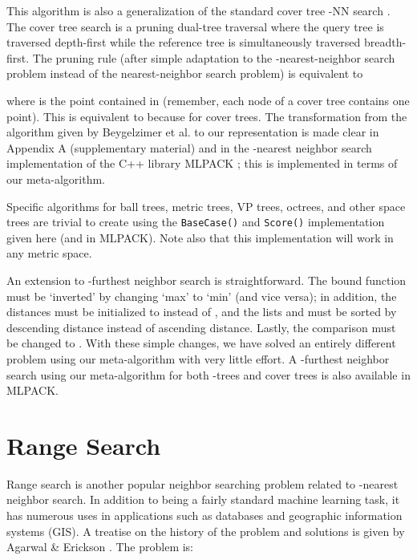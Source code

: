 \documentclass{article}
\begin{document}
This algorithm is also a generalization of the standard cover tree -NN search
\cite{langford2006}.  The cover tree search is a pruning dual-tree
traversal where the query tree is traversed depth-first while the reference
tree is simultaneously traversed breadth-first.  The pruning rule (after
simple adaptation to the -nearest-neighbor search problem instead of the
nearest-neighbor search problem) is equivalent to

\vspace*{-0.8em}

\vspace*{-1.8em}

where  is the point contained in  (remember, each node of a
cover tree contains one point).  This is equivalent to 
because  for cover trees.  The transformation from the
algorithm given by Beygelzimer et al.   to our
representation is made clear in Appendix A (supplementary material) and in the
-nearest neighbor search implementation of the C++ library MLPACK
\cite{curtin2011}; this is implemented in terms of our meta-algorithm.

\vspace*{-0.1em}
Specific algorithms for ball trees, metric trees, VP trees, octrees, and other
space trees are trivial to create using the \texttt{BaseCase()} and
\texttt{Score()} implementation given here (and in MLPACK).  Note also that this
implementation will work in any metric space.

\vspace*{-0.1em}
An extension to -furthest neighbor search is straightforward.  The bound
function must be `inverted' by changing `max' to `min' (and vice versa); in
addition, the distances  must be initialized to  instead of
, and the lists  and  must be sorted by descending distance
instead of ascending distance.  Lastly, the comparison  must be
changed to .  With these simple changes, we have solved an
entirely different problem using our meta-algorithm with very little effort.  A
-furthest neighbor search using our meta-algorithm for both -trees and
cover trees is also available in MLPACK.


\vspace*{-0.5em}
\section{Range Search}
\label{sec:range}

\vspace*{-0.1em}
Range search is another popular neighbor searching problem related to
-nearest neighbor search.  In addition to being a fairly standard machine
learning task, it has numerous uses in applications such as databases and
geographic information systems (GIS).  A treatise on the history of the problem
and solutions is given by Agarwal \& Erickson .  The problem
is:
\end{document}

